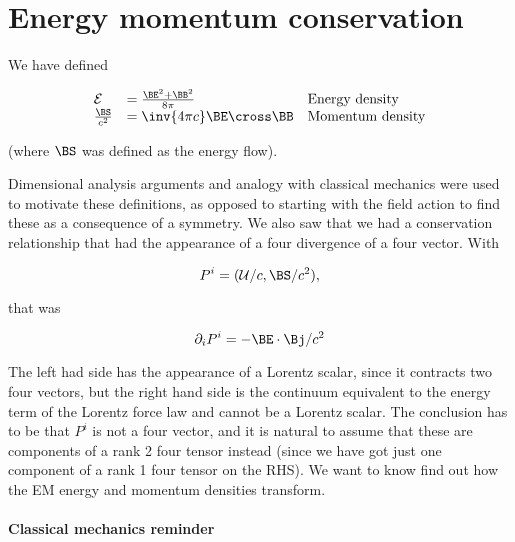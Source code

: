 %
%
\section{Energy momentum conservation}

We have defined

\begin{equation}\label{eqn:relativisticElectrodynamicsL21b:320}
\begin{array}{l l l}
\mathcal{E} &= \frac{\BE^2 + \BB^2}{8\pi} & \mbox{Energy density} \\
\frac{\BS}{c^2} &= \inv{4 \pi c} \BE \cross \BB & \mbox{Momentum density}
\end{array}
\end{equation}

(where \(\BS\) was defined as the energy flow).

Dimensional analysis arguments and analogy with classical mechanics were used to motivate these definitions, as opposed to starting with the field action to find these as a consequence of a symmetry.  We also saw that we had a conservation relationship that had the appearance of a four divergence of a four vector.  With

\begin{equation}\label{eqn:relativisticElectrodynamicsL21b:340}
P^i = (\mathcal{U}/c, \BS/c^2),
\end{equation}

that was

\begin{equation}\label{eqn:relativisticElectrodynamicsL21b:360}
\partial_i P^i = - \BE \cdot \Bj/c^2
\end{equation}

The left had side has the appearance of a Lorentz scalar, since it contracts two four vectors, but the right hand side is the continuum equivalent to the energy term of the Lorentz force law and cannot be a Lorentz scalar.  The conclusion has to be that \(P^i\) is not a four vector, and it is natural to assume that these are components of a rank 2 four tensor instead (since we have got just one component of a rank 1 four tensor on the RHS).  We want to know find out how the EM energy and momentum densities transform.

\paragraph{Classical mechanics reminder}

